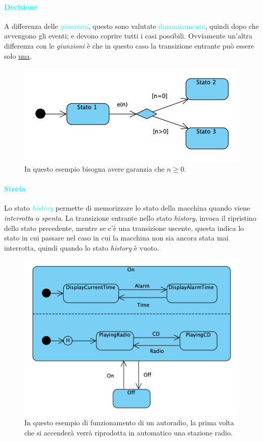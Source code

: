 \paragraph{\textcolor{cyan}{Decisione}}

A differenza delle \emph{\textcolor{cyan}{giunzioni}}, questo sono valutate \textcolor{cyan}{dinamicamente}, quindi dopo che avvengono
gli eventi; e devono coprire tutti i casi possibili. Ovviamente un'altra differenza con le \emph{giunzioni} è che in questo caso la transizione
entrante può essere solo \underline{una}.

\begin{figure}[H]
    \captionsetup{justification=centering}
    \centering
    \includegraphics[scale=0.7]{img/choice.png}
    \caption{In questo esempio bisogna avere garanzia che $n \geq 0$.}
\end{figure}

\paragraph{\textcolor{cyan}{Storia}}

Lo stato \emph{\textcolor{cyan}{history}} permette di memorizzare lo stato della macchina
quando viene \emph{interrotta} o \emph{spenta}. La transizione entrante nello stato \emph{history}, invoca il
ripristino dello stato precedente, mentre se c'è una transizione uscente, questa indica lo stato in cui passare nel caso
in cui la macchina non sia ancora stata mai interrotta, quindi quando lo stato \emph{history} è vuoto.

\begin{figure}[H]
    \captionsetup{justification=centering}
    \centering
    \includegraphics[scale=0.7]{img/history.png}
    \caption{In questo esempio di funzionamento di un autoradio, la prima volta che si accenderà verrà riprodotta in automatico una stazione radio.}
\end{figure}